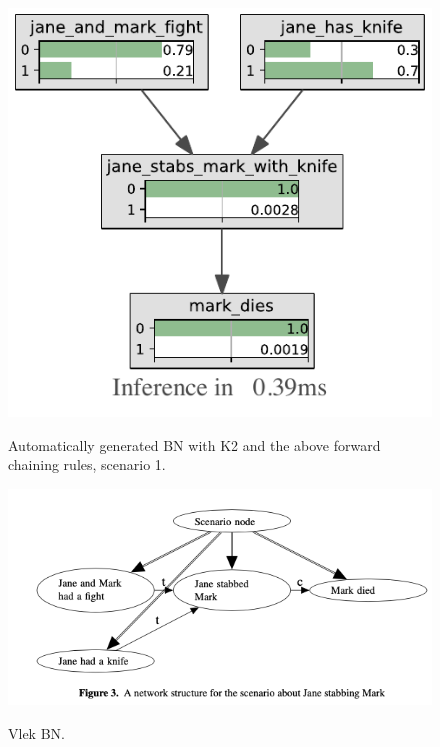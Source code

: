\begin{figure}[htbp]
\begin{center}
\includegraphics[]{images/Kb1.pdf}
\caption{Automatically generated BN with K2 and the above forward chaining rules, scenario 1.}
\label{kb1}
\includegraphics[scale=0.55]{images/vlek2015a.png}
\caption{Vlek BN.}
\label{vlek1}
\end{center}
\end{figure}


